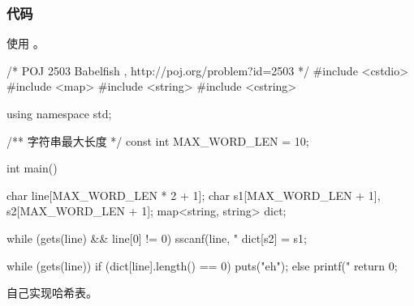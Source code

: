 \subsubsection{代码}
使用  。

\begin{Codex}[label=babelfish_map.cpp]
/* POJ 2503 Babelfish , http://poj.org/problem?id=2503 */
#include <cstdio>
#include <map>
#include <string>
#include <cstring>

using namespace std;

/** 字符串最大长度 */
const int MAX_WORD_LEN = 10;

int main() {
    char line[MAX_WORD_LEN * 2 + 1];
    char s1[MAX_WORD_LEN + 1], s2[MAX_WORD_LEN + 1];
    map<string, string> dict;

    while (gets(line) && line[0] != 0) {
        sscanf(line, "%
        dict[s2] = s1;
    }

    while (gets(line)) {
        if (dict[line].length() == 0) puts("eh");
        else printf("%
    }
    return 0;
}
\end{Codex}


自己实现哈希表。

